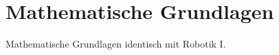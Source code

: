 

\section{Mathematische Grundlagen}
\label{mat:sec::mathematische_grundlagen}
Mathematische Grundlagen identisch mit Robotik I.